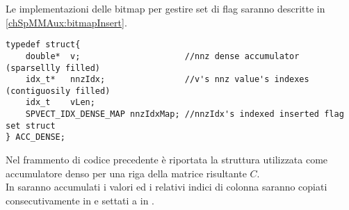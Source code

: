 Le implementazioni delle bitmap per gestire set di flag saranno descritte in \ref{chSpMMAux:bitmapInsert}.\\
\begin{lstlisting}
typedef struct{
    double*  v;                     //nnz dense accumulator		(sparsellly filled)
    idx_t*   nnzIdx;                //v's nnz value's indexes		(contiguosily filled)
    idx_t    vLen;
    SPVECT_IDX_DENSE_MAP nnzIdxMap; //nnzIdx's indexed inserted flag set struct
} ACC_DENSE;
\end{lstlisting}
Nel frammento di codice precedente è riportata la struttura utilizzata come accumulatore denso per una riga della matrice risultante $C$.\\
In  saranno accumulati i valori \nnz ed i relativi indici di colonna 
saranno copiati consecutivamente in  e settati a  in .

